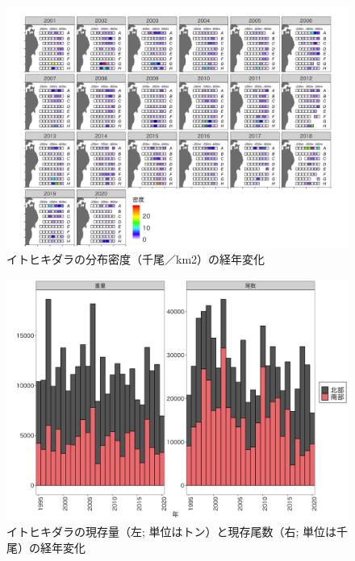 \documentclass[11pt]{article} %
\begin{document}
\begin{linenumbers}
\begin{figure}[h]
  \centering
  \includegraphics[width = 14cm]{イトヒキダラdens.png}
  \caption{イトヒキダラの分布密度（千尾／km2）の経年変化}
\end{figure}

\begin{figure}[h]
  \centering
  \includegraphics[width = 14cm]{イトヒキダラtrend.png}
  \caption{イトヒキダラの現存量（左; 単位はトン）と現存尾数（右; 単位は千尾）の経年変化}
\end{figure}


\end{linenumbers}
\end{document}
